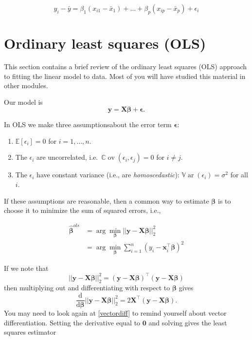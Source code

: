 \documentclass[
]{book}
\providecommand{\tightlist}{%
  \setlength{\itemsep}{0pt}\setlength{\parskip}{0pt}}
\theoremstyle{definition}
\theoremstyle{definition}
\theoremstyle{definition}
\theoremstyle{definition}
\theoremstyle{remark}
\begin{document}
\[y_i - \bar{y} = \beta_1 (x_{i1}-\bar{x}_1)+\ldots+\beta_p (x_{ip}-\bar{x}_p)+\epsilon_i\]

\section{Ordinary least squares (OLS)}\label{ordinary-least-squares-ols}

This section contains a brief review of the ordinary least squares (OLS) approach to fitting the linear model to data. Most of you will have studied this material in other modules.

Our model is
\[
\mathbf y=\mathbf X\boldsymbol \beta+{\pmb \epsilon}.
\]

In OLS we make three assumptionsabout the error term \(\boldsymbol \epsilon\):

\begin{enumerate}
\def\labelenumi{\arabic{enumi}.}
\tightlist
\item
  \({\mathbb{E}}[\epsilon_i]=0\) for \(i=1, \ldots , n\).
\item
  The \(\epsilon_i\) are uncorrelated, i.e.~\({\mathbb{C}\operatorname{ov}}(\epsilon_i, \epsilon_j)=0\) for \(i \neq j\).
\item
  The \(\epsilon_i\) have constant variance (i.e., are \emph{homoscedastic}): \({\mathbb{V}\operatorname{ar}}(\epsilon_i)=\sigma^2\) for all \(i\).
\end{enumerate}

If these assumptions are reasonable, then
a common way to estimate \(\boldsymbol \beta\) is to choose it to minimize the sum of squared errors, i.e.,

\begin{align*}
{\hat{\boldsymbol \beta}}^{ols} &= \arg \min_{\boldsymbol \beta} || \mathbf y- \mathbf X\boldsymbol \beta||_2^2\\
&= \arg \min_{\boldsymbol \beta} \sum_{i=1}^n (y_i - \mathbf x_i^\top \boldsymbol \beta)^2
\end{align*}

If we note that
\[|| \mathbf y- \mathbf X\boldsymbol \beta||_2^2 = (\mathbf y-\mathbf X\boldsymbol \beta)^\top(\mathbf y-\mathbf X\boldsymbol \beta) \]
then multiplying out and differentiating with respect to \(\boldsymbol \beta\) gives
\[\frac{\mathrm d}{\mathrm d\boldsymbol \beta} || \mathbf y- \mathbf X\boldsymbol \beta||_2^2 = 2\mathbf X^\top (\mathbf y- \mathbf X\boldsymbol \beta).\]
You may need to look again at \ref{vectordiff} to remind yourself about vector differentiation. Setting the derivative equal to \({\boldsymbol 0}\) and solving gives the least squares estimator
\end{document}
